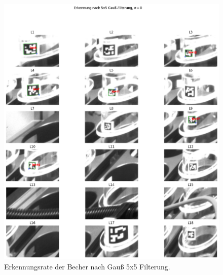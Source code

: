     \begin{figure}
        \caption[Erkennungsrate nach Gauß 5x5 Filterung]{\small Erkennungsrate der Becher nach Gauß 5x5 Filterung.}\label{fig:figure23}
        \includegraphics[width = \textwidth]{Bilder/ErkennungsrateGauss.png}
        \centering
    \end{figure}

